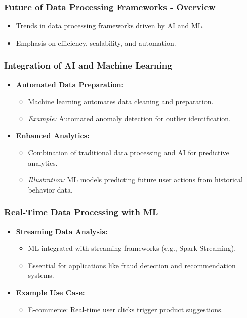 \documentclass[aspectratio=169]{beamer}
\begin{document}
\begin{frame}[fragile]
  \frametitle{Future of Data Processing Frameworks - Overview}
  \begin{itemize}
    \item Trends in data processing frameworks driven by AI and ML.
    \item Emphasis on efficiency, scalability, and automation.
  \end{itemize}
\end{frame}

\begin{frame}[fragile]
  \frametitle{Integration of AI and Machine Learning}
  \begin{itemize}
    \item \textbf{Automated Data Preparation:}
      \begin{itemize}
        \item Machine learning automates data cleaning and preparation.
        \item \textit{Example:} Automated anomaly detection for outlier identification.
      \end{itemize}
    \item \textbf{Enhanced Analytics:}
      \begin{itemize}
        \item Combination of traditional data processing and AI for predictive analytics.
        \item \textit{Illustration:} ML models predicting future user actions from historical behavior data.
      \end{itemize}
  \end{itemize}
\end{frame}

\begin{frame}[fragile]
  \frametitle{Real-Time Data Processing with ML}
  \begin{itemize}
    \item \textbf{Streaming Data Analysis:}
      \begin{itemize}
        \item ML integrated with streaming frameworks (e.g., Spark Streaming).
        \item Essential for applications like fraud detection and recommendation systems.
      \end{itemize}
    \item \textbf{Example Use Case:} 
      \begin{itemize}
        \item E-commerce: Real-time user clicks trigger product suggestions.
      \end{itemize}
  \end{itemize}
\end{frame}
\end{document}

